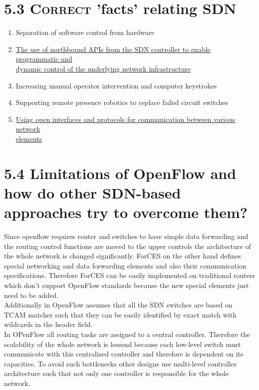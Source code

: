 \documentclass{article}
\begin{document}
	\section*{5.3 \textsc{Correct} 'facts' relating SDN}
	\begin{adjustwidth}{2em}{2em}
		\begin{enumerate}[-]
			\item Separation of software control from hardware
			\item \underline{The use of northbound APIs from the SDN controller to enable programmatic and} \\ \underline{dynamic control of the underlying network infrastructure}
			\item Increasing manual operator intervention and computer keystrokes
			\item Supporting remote presence robotics to replace failed circuit switches
			\item \underline{Using open interfaces and protocols for communication between various network} \\ \underline{elements}
		\end{enumerate}
	\end{adjustwidth}
	
	\section*{5.4 Limitations of OpenFlow and how do other SDN-based approaches try to overcome them?}
	\begin{adjustwidth}{2em}{2em}
		Since openflow requires router and switches to have simple data forwarding and the routing control functions are moved to the upper controls the architecture of the whole network is changed significantly. ForCES on the other hand defines special networking and data forwarding elements and also their communication specifications. Therefore ForCES can be easily implemented on traditional routers which don't support OpenFlow standards because the new special elements just need to be added. \\
		Additionally in OpenFlow assumes that all the SDN switches are based on TCAM matcher such that they can be easily identified by exact match with wildcards in the header field. \\
		In OPenFlow all routing tasks are assigned to a central controller. Therefore the scalability of the whole network is lessend because each low-level switch must communicate with this centralized controller and therefore is dependent on its capacities. To avoid such bottlenecks other designs use multi-level controller architecture such that not only one controller is responsible for the whole network.
	\end{adjustwidth}
	
\end{document}
